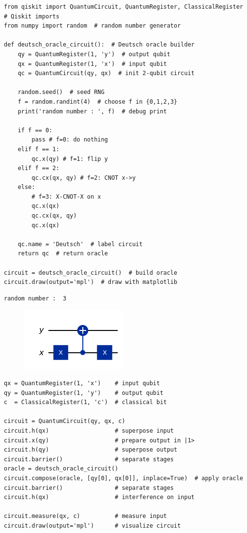 \begin{lstlisting}[style=python]
from qiskit import QuantumCircuit, QuantumRegister, ClassicalRegister  # Qiskit imports
from numpy import random  # random number generator

def deutsch_oracle_circuit():  # Deutsch oracle builder
	qy = QuantumRegister(1, 'y')  # output qubit
	qx = QuantumRegister(1, 'x')  # input qubit
	qc = QuantumCircuit(qy, qx)  # init 2-qubit circuit
	
	random.seed()  # seed RNG
	f = random.randint(4)  # choose f in {0,1,2,3}
	print('random number : ', f)  # debug print
	
	if f == 0: 
		pass # f=0: do nothing 
	elif f == 1: 
		qc.x(qy) # f=1: flip y 
	elif f == 2: 
		qc.cx(qx, qy) # f=2: CNOT x->y 
	else:
		# f=3: X-CNOT-X on x 
		qc.x(qx)
		qc.cx(qx, qy)
		qc.x(qx)  
	
	qc.name = 'Deutsch'  # label circuit
	return qc  # return oracle

circuit = deutsch_oracle_circuit()  # build oracle
circuit.draw(output='mpl')  # draw with matplotlib
\end{lstlisting}
\begin{lstlisting}
random number :  3
\end{lstlisting}
\begin{figure}[h!]\centering
\includegraphics[scale=.5]{images/lab03_1}
\end{figure}
\begin{lstlisting}[style=python]
qx = QuantumRegister(1, 'x')    # input qubit
qy = QuantumRegister(1, 'y')    # output qubit
c  = ClassicalRegister(1, 'c')  # classical bit

circuit = QuantumCircuit(qy, qx, c)
circuit.h(qx)                   # superpose input
circuit.x(qy)                   # prepare output in |1>
circuit.h(qy)                   # superpose output
circuit.barrier()               # separate stages
oracle = deutsch_oracle_circuit()
circuit.compose(oracle, [qy[0], qx[0]], inplace=True)  # apply oracle
circuit.barrier()               # separate stages
circuit.h(qx)                   # interference on input

circuit.measure(qx, c)          # measure input
circuit.draw(output='mpl')      # visualize circuit
\end{lstlisting}
